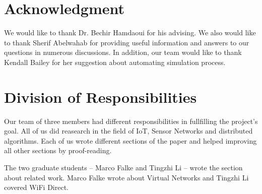\documentclass[12pt,journal]{IEEEtran}
\begin{document}
\section*{Acknowledgment}
We would like to thank Dr. Bechir Hamdaoui for his advising. We also would like to thank Sherif Abelwahab for providing useful information and answers to our questions in numerous discussions. In addition, our team would like to thank Kendall Bailey for her suggestion about automating simulation process.



\ifCLASSOPTIONcaptionsoff
  \newpage
\fi




%
%

{}


\appendices
\section{Division of Responsibilities}
Our team of three members had different responsibilities in fullfilling the project's goal. All of us did reasearch in the field of IoT, Sensor Networks and distributed algorithms. Each of us wrote different sections of the paper and helped improving all other sections by proof-reading.

The two graduate students -- Marco Falke and Tingzhi Li -- wrote the section about related work. Marco Falke wrote about Virtual Networks and Tingzhi Li covered WiFi Direct.
\end{document}
